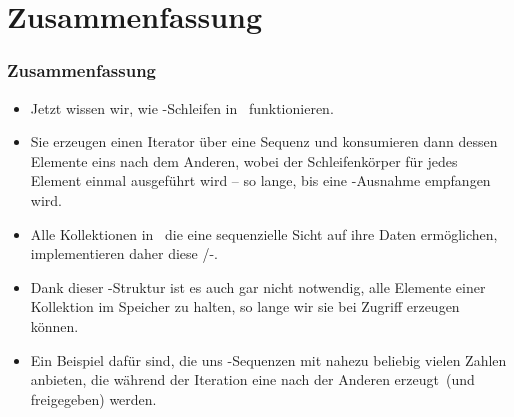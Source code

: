 \documentclass[aspectratio=169,mathserif,notheorems]{beamer}%
\begin{document}
\section{Zusammenfassung}%
%
\begin{frame}%
\frametitle{Zusammenfassung}%
\begin{itemize}%
\item Jetzt wissen wir, wie -Schleifen in \python\ funktionieren.%
%
\item<2-> Sie erzeugen einen Iterator über eine Sequenz und konsumieren dann dessen Elemente eins nach dem Anderen, wobei der Schleifenkörper für jedes Element einmal ausgeführt wird -- so lange, bis eine -Ausnahme empfangen wird.%
%
\item<3-> Alle Kollektionen in \python\ die eine sequenzielle Sicht auf ihre Daten ermöglichen, implementieren daher diese /-\cite{PEP234}.%
%
\item<4-> Dank dieser -Struktur ist es auch gar nicht notwendig, alle Elemente einer Kollektion im Speicher zu halten, so lange wir sie bei Zugriff erzeugen können.%
%
\item<5-> Ein Beispiel dafür sind, die uns -Sequenzen mit nahezu beliebig vielen Zahlen anbieten, die während der Iteration eine nach der Anderen erzeugt~(und freigegeben) werden.%
\end{itemize}%
\end{frame}%
%
\endPresentation%
\end{document}
